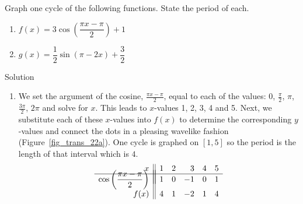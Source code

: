 \ifcalculus
\begin{example}  \label{cosinesinegraphex1} 
Graph one cycle of the following functions. State the period of each.

\begin{multicols}{2}

\begin{enumerate}

\item  $f(x) = 3 \cos\left(\dfrac{\pi x - \pi}{2}\right) + 1$

\item  $g(x) = \dfrac{1}{2} \sin(\pi - 2x) + \dfrac{3}{2}$

\end{enumerate}

\end{multicols}

Solution 

\begin{enumerate}

\item  We set the argument of the cosine, $\frac{\pi x - \pi}{2}$, equal to each of the values:  $0$, $\frac{\pi}{2}$, $\pi$, $\frac{3\pi}{2}$, $2\pi$ and solve for $x$. This leads to $x$-values 1, 2, 3, 4 and 5. Next, we substitute each of these $x$-values into $f(x)$ to determine the corresponding $y$-values and connect the dots in a pleasing wavelike fashion (Figure~\ref{fig_trans_22a}). One cycle is graphed on $[1,5]$ so the period is the length of that interval which is $4$.
\renewcommand{\arraystretch}{1.5}
\[ \begin{array}{r||rrrrr}  
x                                      &1 &2 &3  &4 &5\\ \hline
& & & & & \\[-0.6cm]
\cos\left(\dfrac{\pi x - \pi}{2}\right)&1 &0 &-1 &0 &1\\
f(x)                                   &4 &1 &-2 &1 &4
\end{array} \]
\renewcommand{\arraystretch}{1}



\end{enumerate}
\end{example}
